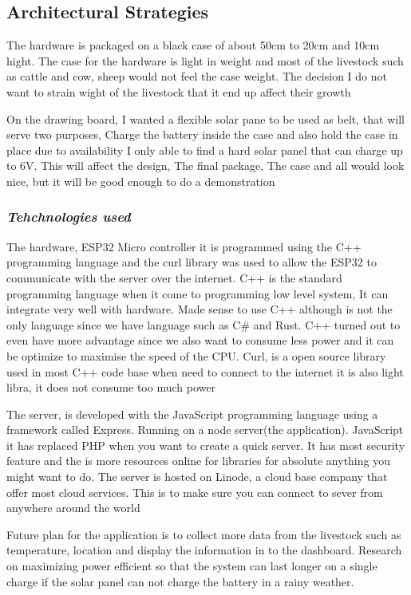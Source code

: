 \subsection{Architectural Strategies}

The hardware is packaged on a black case of about 50cm to 20cm and 10cm hight. The case
for the hardware is light in weight and most of the livestock such as cattle and cow, sheep would not
feel the case weight. The decision I do not want to strain wight of the livestock that it end up
affect their growth

On the drawing board, I wanted a flexible solar pane to be used  as belt, that will
serve two purposes, Charge the battery inside the case and also hold the case in place
due to availability I only able to find a hard solar panel that can charge up to 6V.
This will affect the design, The final package, The case and all would look nice, but it will
be good enough to do a demonstration


\subsubsection{\textit{Tehchnologies used}}

The hardware, ESP32 Micro controller it is programmed using the C++ programming
language and the curl library was used to allow the ESP32 to communicate with
the server over the internet. C++ is the standard programming language when it
come to programming low level system, It can integrate very well with hardware.
Made sense to use C++ although is not the only language since we have
language such as C\# and Rust. C++ turned out to even have more advantage since
we also want to consume less power and it can be optimize to maximise the speed
of the CPU. Curl, is a open source library used in most C++ code base when need
to connect to the internet it is also light libra, it does not consume too much
power

The server, is developed with the JavaScript programming language using a
framework called Express. Running on a node server(the application). JavaScript
it has replaced PHP when you want to create a quick server. It has most security
feature and the is more resources online for libraries for absolute
anything you might want to do. The server is hosted on Linode, a cloud base
company that offer most cloud services. This is to make sure you can connect
to sever from anywhere around the world

Future plan for the application is to collect more data from the livestock such as temperature,
location and display the information in to the dashboard. Research on maximizing power efficient so that
the system can last longer on a single charge if the solar panel can not charge the battery in a
rainy weather.

